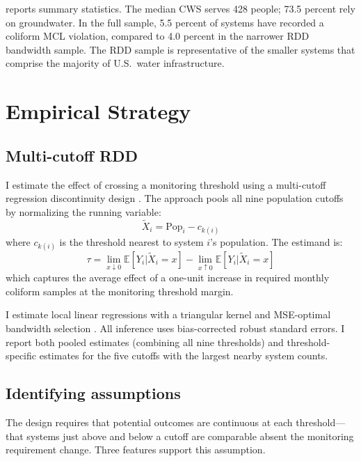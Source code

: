 \documentclass[12pt]{article}
\newcommand{\E}{\mathbb{E}}
\begin{document}


 reports summary statistics. The median CWS serves 428 people; 73.5 percent rely on groundwater. In the full sample, 5.5 percent of systems have recorded a coliform MCL violation, compared to 4.0 percent in the narrower RDD bandwidth sample. The RDD sample is representative of the smaller systems that comprise the majority of U.S.\ water infrastructure.


\section{Empirical Strategy}
\label{sec:strategy}

\subsection{Multi-cutoff RDD}

I estimate the effect of crossing a monitoring threshold using a multi-cutoff regression discontinuity design \citep{cattaneo2016interpreting}. The approach pools all nine population cutoffs by normalizing the running variable:
\begin{equation}
\tilde{X}_i = \text{Pop}_i - c_{k(i)}
\end{equation}
where $c_{k(i)}$ is the threshold nearest to system $i$'s population. The estimand is:
\begin{equation}
\tau = \lim_{x \downarrow 0} \E[Y_i | \tilde{X}_i = x] - \lim_{x \uparrow 0} \E[Y_i | \tilde{X}_i = x]
\end{equation}
which captures the average effect of a one-unit increase in required monthly coliform samples at the monitoring threshold margin.

I estimate local linear regressions with a triangular kernel and MSE-optimal bandwidth selection \citep{calonico2014robust}. All inference uses bias-corrected robust standard errors. I report both pooled estimates (combining all nine thresholds) and threshold-specific estimates for the five cutoffs with the largest nearby system counts.

\subsection{Identifying assumptions}

The design requires that potential outcomes are continuous at each threshold---that systems just above and below a cutoff are comparable absent the monitoring requirement change. Three features support this assumption.
\end{document}
